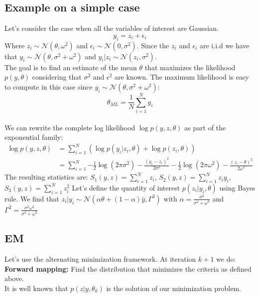 \documentclass{article}
\theoremstyle{plain}
\theoremstyle{plain}
\theoremstyle{definition}
\begin{document}
\subsection{Example on a simple case}

Let's consider the case when all the variables of interest are Gaussian.
\begin{equation}
y_i = z_i + \epsilon_i
\end{equation}
Where $z_i \sim \mathcal{N}(\theta,\omega^2)$ and $\epsilon_i \sim \mathcal{N}(0,\sigma^2)$.
Since the $z_i$ and $\epsilon_i$ are i.i.d we have that $y_i \sim \mathcal{N}(\theta,\sigma^2 + \omega^2)$ and $y_i|z_i \sim \mathcal{N}(z_i,\sigma^2)$.\\
The goal is to find an estimate of the mean $\theta$ that maximizes the likelihood $p(y,\theta)$ considering that $\sigma^2$ and $\epsilon^2$ are known. The maximum likelihood is easy to compute in this case since $y_i \sim \mathcal{N}(\theta,\sigma^2 + \omega^2)$:
\begin{equation}
\theta_{ML} = \frac{1}{N}\sum_{i=1}^{N}{y_i}
\end{equation}\\

We can rewrite the complete log likelihood $\log p(y,z,\theta)$ as part of the exponential family:
\begin{equation}
\begin{split}
\log p(y,z,\theta) & = \sum_{i=1}^{N}{(\log p(y_i|z_i,\theta) + \log p(z_i,\theta))}\\
& = \sum_{i=1}^{N}{-\frac{1}{2}\log(2\pi\sigma^2) -\frac{(y_i - z_i)^2}{2\sigma^2} -\frac{1}{2}\log(2\pi\omega^2) -\frac{(z_i - \theta)^2}{2\omega^2}}
\end{split}
\end{equation}
The resulting statistics are: $S_1(y,z) = \sum_{i=1}^{N}{z_i} $, $S_2(y,z) = \sum_{i=1}^{N}{z_iy_i} $,$S_3(y,z) = \sum_{i=1}^{N}{z_i^2} $
Let's define the quantity of interest $p(z_i|y_i,\theta)$ using Bayes rule.
We find that $z_i|y_i \sim \mathcal{N}(\alpha\theta+(1-\alpha)\bar{y}, \Gamma^2)$ with $\alpha = \frac{\sigma^2}{\sigma^2+\omega^2}$ and $\Gamma^2 = \frac{\sigma^2\omega^2}{\sigma^2+\omega^2}$


\subsection{EM}
Let's use the alternating minimization framework. At iteration $k+1$ we do:\\
\textbf{Forward mapping:} Find the distribution that minimizes the criteria as defined above.\\
It is well known that $p(z|y,\theta_k)$ is the solution of our minimization problem.
\end{document}
